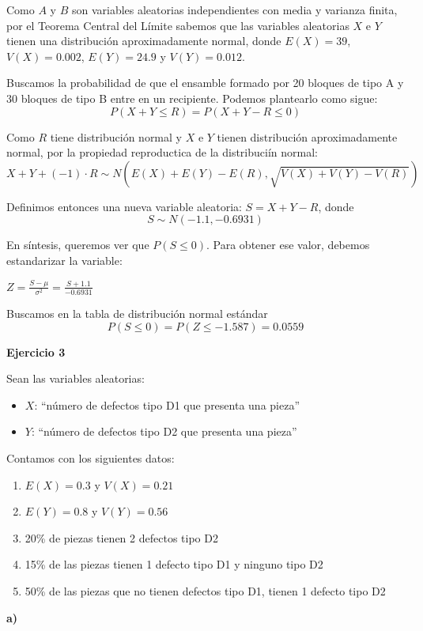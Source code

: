 \documentclass[11pt]{article}
\begin{document}
Como $A$ y $B$ son variables aleatorias independientes con media y varianza finita, por el Teorema Central del L\'imite sabemos que las variables aleatorias $X$ e $Y$ tienen una distribuci\'on aproximadamente normal, donde $E(X) = 39$, $V(X) = 0.002$, $E(Y) = 24.9$ y $V(Y) = 0.012$.

Buscamos la probabilidad de que el ensamble formado por 20 bloques de tipo A y 30 bloques de tipo B entre en un recipiente. Podemos plantearlo como sigue:
$$P(X+Y \leq R) = P(X+Y-R \leq 0)$$

Como $R$ tiene distribuci\'on normal y $X$ e $Y$ tienen distribuci\'on aproximadamente normal, por la propiedad reproductica de la distribuci\'in normal:
$$X + Y + (-1) \cdot R \sim N(E(X)+E(Y)-E(R), \sqrt{V(X)+V(Y)-V(R)})$$

Definimos entonces una nueva variable aleatoria: $S = X+Y-R$, donde
$$S \sim N(-1.1, -0.6931)$$

En s\'intesis, queremos ver que $P(S \leq 0)$. Para obtener ese valor, debemos estandarizar la variable:

$Z = \frac{S - \mu}{\sigma^2} = \frac{S + 1.1}{-0.6931}$

Buscamos en la tabla de distribuci\'on normal est\'andar
$$P(S \leq 0) = P(Z \leq -1.587) = 0.0559$$


\textbf{Ejercicio 3}

Sean las variables aleatorias:
\begin{itemize}
    \item $X$: ``n\'umero de defectos tipo D1 que presenta una pieza''
    \item $Y$: ``n\'umero de defectos tipo D2 que presenta una pieza''
\end{itemize}
Contamos con los siguientes datos:
\begin{enumerate}
    \item $E(X) = 0.3$ y $V(X) = 0.21$
    \item $E(Y) = 0.8$ y $V(Y) = 0.56$
    \item 20\% de piezas tienen 2 defectos tipo D2
    \item 15\% de las piezas tienen 1 defecto tipo D1 y ninguno tipo D2
    \item 50\% de las piezas que no tienen defectos tipo D1, tienen 1 defecto tipo D2
\end{enumerate}

\textbf{a)}
\end{document}
